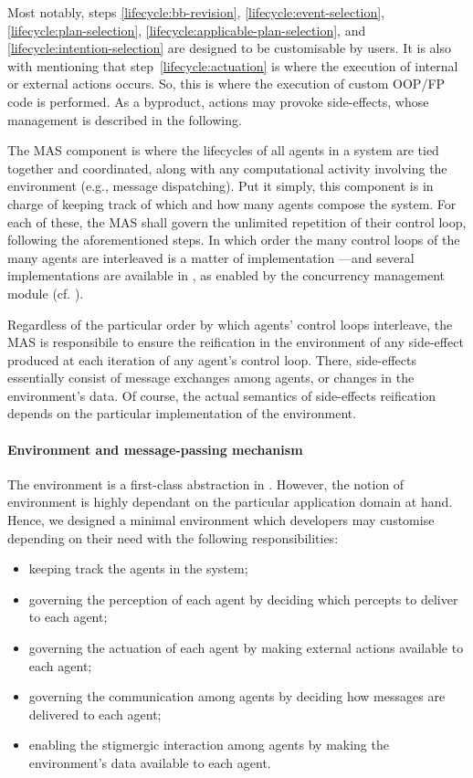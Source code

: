 Most notably, steps
\ref{lifecycle:bb-revision},
\ref{lifecycle:event-selection},
\ref{lifecycle:plan-selection},
\ref{lifecycle:applicable-plan-selection},
and
\ref{lifecycle:intention-selection}
are designed to be customisable by users.
%
It is also with mentioning that step~\ref{lifecycle:actuation} is where the execution of internal or external actions occurs.
%
So, this is where the execution of custom \ac{OOP}/\ac{FP} code is performed.
%
As a byproduct, actions may provoke side-effects, whose management is described in the following.

The \ac{MAS} component is where the lifecycles of all agents in a system are tied together and coordinated,
along with any computational activity involving the environment (e.g., message dispatching).
%
Put it simply, this component is in charge of keeping track of which and how many agents compose the system.
%
For each of these, the \ac{MAS} shall govern the unlimited repetition of their control loop,
following the aforementioned steps.
%
In which order the many control loops of the many agents are interleaved is a matter of implementation%
---and several implementations are available in \jakta{},
as enabled by the concurrency management module (cf. ).

Regardless of the particular order by which agents' control loops interleave,
the \ac{MAS} is responsibile to ensure the reification in the environment
of any side-effect produced at each iteration of any agent's control loop.
%
There, side-effects essentially consist of message exchanges among agents,
or changes in the environment's data.
%
Of course, the actual semantics of side-effects reification depends on the particular implementation of the environment.

\paragraph{Environment and message-passing mechanism}

The environment is a first-class abstraction in \jakta{}.
%
However, the notion of environment is highly dependant on the particular application domain at hand.
%
Hence, we designed a minimal environment which developers may customise depending on their need
with the following responsibilities:
%
\begin{itemize}
    \item keeping track the agents in the system;
    \item governing the perception of each agent by deciding which percepts to deliver to each agent;
    \item governing the actuation of each agent by making external actions available to each agent;
    \item governing the communication among agents by deciding how messages are delivered to each agent;
    \item enabling the stigmergic interaction among agents by making the environment's data available to each agent.
\end{itemize}

